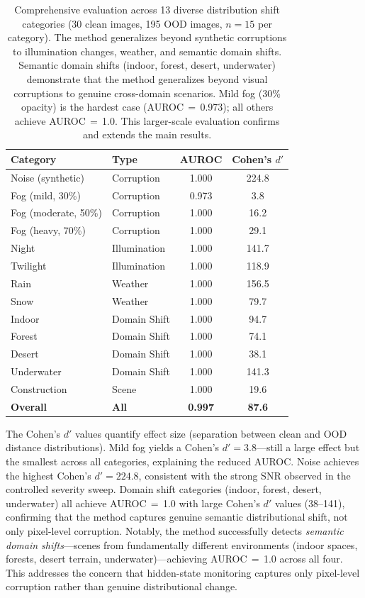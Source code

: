 \documentclass[11pt]{article}
\begin{document}
\begin{table}[t]
\centering
\caption{Comprehensive evaluation across 13 diverse distribution shift categories (30 clean images, 195 OOD images, $n=15$ per category). The method generalizes beyond synthetic corruptions to illumination changes, weather, and semantic domain shifts. Semantic domain shifts (indoor, forest, desert, underwater) demonstrate that the method generalizes beyond visual corruptions to genuine cross-domain scenarios. Mild fog (30\% opacity) is the hardest case (AUROC\,$=$\,0.973); all others achieve AUROC\,$=$\,1.0. This larger-scale evaluation confirms and extends the main results.}
\label{tab:comprehensive}
\small
\begin{tabular}{llcc}
\toprule
\textbf{Category} & \textbf{Type} & \textbf{AUROC} & \textbf{Cohen's $d'$} \\
\midrule
Noise (synthetic) & Corruption & 1.000 & 224.8 \\
Fog (mild, 30\%) & Corruption & 0.973 & 3.8 \\
Fog (moderate, 50\%) & Corruption & 1.000 & 16.2 \\
Fog (heavy, 70\%) & Corruption & 1.000 & 29.1 \\
Night & Illumination & 1.000 & 141.7 \\
Twilight & Illumination & 1.000 & 118.9 \\
Rain & Weather & 1.000 & 156.5 \\
Snow & Weather & 1.000 & 79.7 \\
Indoor & Domain Shift & 1.000 & 94.7 \\
Forest & Domain Shift & 1.000 & 74.1 \\
Desert & Domain Shift & 1.000 & 38.1 \\
Underwater & Domain Shift & 1.000 & 141.3 \\
Construction & Scene & 1.000 & 19.6 \\
\midrule
\textbf{Overall} & \textbf{All} & \textbf{0.997} & \textbf{87.6} \\
\bottomrule
\end{tabular}
\end{table}

The Cohen's $d'$ values quantify effect size (separation between clean and OOD distance distributions).
Mild fog yields a Cohen's $d' = 3.8$---still a large effect but the smallest across all categories, explaining the reduced AUROC.
Noise achieves the highest Cohen's $d' = 224.8$, consistent with the strong SNR observed in the controlled severity sweep.
Domain shift categories (indoor, forest, desert, underwater) all achieve AUROC\,$=$\,1.0 with large Cohen's $d'$ values (38--141), confirming that the method captures genuine semantic distributional shift, not only pixel-level corruption.
Notably, the method successfully detects \emph{semantic domain shifts}---scenes from fundamentally different environments (indoor spaces, forests, desert terrain, underwater)---achieving AUROC\,$=$\,1.0 across all four.
This addresses the concern that hidden-state monitoring captures only pixel-level corruption rather than genuine distributional change.
\end{document}
